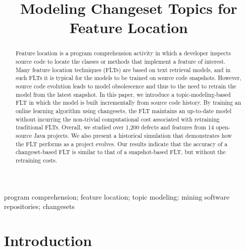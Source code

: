 \documentclass[conference]{IEEEtran}
\begin{document}
\title{Modeling Changeset Topics for Feature Location}
\author{

    \and

}


\maketitle

\begin{abstract}
Feature location is a program comprehension activity in which a developer
inspects source code to locate the classes or methods that implement a feature of interest.
Many feature location techniques (FLTs) are based on text retrieval models, and
in such FLTs it is typical for the models to be trained on source code snapshots.
However, source code evolution leads to model obsolescence and
thus to the need to retrain the model from the latest snapshot.
In this paper, we introduce a topic-modeling-based FLT in which the model
is built incrementally from source code history.
By training an online learning algorithm using changesets, the FLT
maintains an up-to-date model without incurring the non-trivial computational cost associated with retraining traditional FLTs.
Overall, we studied over 1,200 defects and features from 14 open-source Java projects.
We also present a historical simulation that demonstrates how the FLT performs as a project evolves.
Our results indicate that the accuracy of a changeset-based FLT is similar to that of a snapshot-based FLT, but without the retraining costs.
\end{abstract}

\begin{IEEEkeywords}
program comprehension;
feature location;
topic modeling;
mining software repositories;
changesets
\end{IEEEkeywords}

\section{Introduction}
\label{sec:intro}

\end{document}
